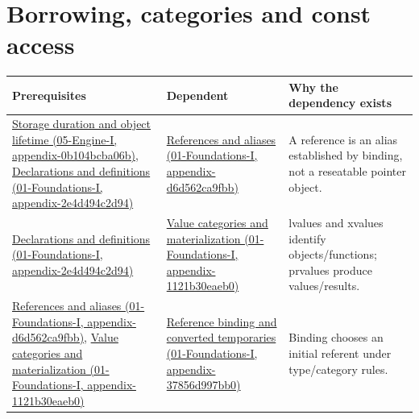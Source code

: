 \section{Borrowing, categories and const access}\label{appendix-4ad47bdd269a-borrowing-categories-and-const-access}

{\def\LTcaptype{none} %
\begin{longtable}[]{@{}
  >{\raggedright\arraybackslash}p{}
  >{\raggedright\arraybackslash}p{}
  >{\raggedright\arraybackslash}p{}@{}}
\toprule\noalign{}
\begin{minipage}[b]{\linewidth}\raggedright
Prerequisites
\end{minipage} & \begin{minipage}[b]{\linewidth}\raggedright
Dependent
\end{minipage} & \begin{minipage}[b]{\linewidth}\raggedright
Why the dependency exists
\end{minipage} \\
\midrule\noalign{}
\endhead
\bottomrule\noalign{}
\endlastfoot
\href{../05-Engine-I/main.pdf\#nameddest=appendix-0b104bcba06b}{Storage duration and object lifetime (05-Engine-I, appendix-0b104bcba06b)}, \href{../01-Foundations-I/main.pdf\#nameddest=appendix-2e4d494c2d94}{Declarations and definitions (01-Foundations-I, appendix-2e4d494c2d94)} & \href{../01-Foundations-I/main.pdf\#nameddest=appendix-d6d562ca9fbb}{References and aliases (01-Foundations-I, appendix-d6d562ca9fbb)} & A reference is an alias established by binding, not a reseatable pointer object. \\
\href{../01-Foundations-I/main.pdf\#nameddest=appendix-2e4d494c2d94}{Declarations and definitions (01-Foundations-I, appendix-2e4d494c2d94)} & \href{../01-Foundations-I/main.pdf\#nameddest=appendix-1121b30eaeb0}{Value categories and materialization (01-Foundations-I, appendix-1121b30eaeb0)} & lvalues and xvalues identify objects/functions; prvalues produce values/results. \\
\href{../01-Foundations-I/main.pdf\#nameddest=appendix-d6d562ca9fbb}{References and aliases (01-Foundations-I, appendix-d6d562ca9fbb)}, \href{../01-Foundations-I/main.pdf\#nameddest=appendix-1121b30eaeb0}{Value categories and materialization (01-Foundations-I, appendix-1121b30eaeb0)} & \href{../01-Foundations-I/main.pdf\#nameddest=appendix-37856d997bb0}{Reference binding and converted temporaries (01-Foundations-I, appendix-37856d997bb0)} & Binding chooses an initial referent under type/category rules. \\

\end{longtable}}
